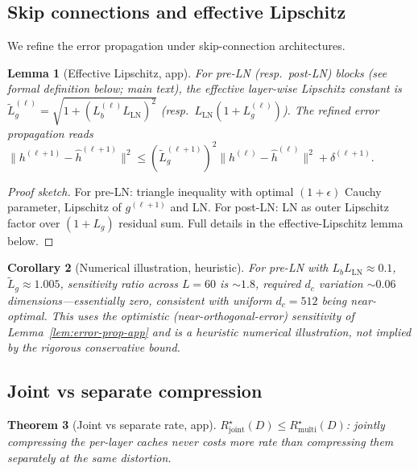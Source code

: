 \documentclass[11pt]{article}
\theoremstyle{plain}
\newtheorem{theorem}{Theorem}[section]
\newtheorem{lemma}[theorem]{Lemma}
\newtheorem{corollary}[theorem]{Corollary}
\theoremstyle{definition}
\theoremstyle{remark}
\begin{document}
\subsection{Skip connections and effective Lipschitz}\label{app:skip-proofs}

We refine the error propagation under skip-connection architectures.

\begin{lemma}[Effective Lipschitz, app]\label{lem:eff-Lip-app}
For pre-LN (resp.\ post-LN) blocks (see formal definition below; main
text), the effective layer-wise Lipschitz constant is
\(\tilde L_g^{(\ell)} = \sqrt{1 + (L_b^{(\ell)} L_{\mathrm{LN}})^2}\)
(resp.\ $L_{\mathrm{LN}}(1 + L_g^{(\ell)})$). The refined error
propagation reads
\(
\|h^{(\ell+1)} - \hat h^{(\ell+1)}\|^2
\leq (\tilde L_g^{(\ell+1)})^2 \|h^{(\ell)} - \hat h^{(\ell)}\|^2
+ \delta^{(\ell+1)}.
\)
\end{lemma}

\begin{proof}[Proof sketch]
For pre-LN: triangle inequality with optimal $(1+\epsilon)$ Cauchy
parameter, Lipschitz of $g^{(\ell+1)}$ and LN. For post-LN: LN as
outer Lipschitz factor over $(1+L_g)$ residual sum. Full details in
the effective-Lipschitz lemma below.
\end{proof}

\begin{corollary}[Numerical illustration, heuristic]\label{cor:MLA-revised-app}
For pre-LN with $L_b L_{\mathrm{LN}} \approx 0.1$,
$\tilde L_g \approx 1.005$, sensitivity ratio across $L = 60$ is
$\sim 1.8$, required $d_c$ variation $\sim 0.06$ dimensions---essentially
zero, consistent with uniform $d_c = 512$ being near-optimal. This uses
the optimistic (near-orthogonal-error) sensitivity of
Lemma~\ref{lem:error-prop-app} and is a heuristic numerical
illustration, not implied by the rigorous conservative bound.
\end{corollary}

\subsection{Joint vs separate compression}\label{app:joint-vs-sep}

\begin{theorem}[Joint vs separate rate, app]\label{thm:joint-sep-app}
$R^\star_{\mathrm{joint}}(D) \leq R^\star_{\mathrm{multi}}(D)$: jointly
compressing the per-layer caches never costs more rate than
compressing them separately at the same distortion.
\end{theorem}
\end{document}
